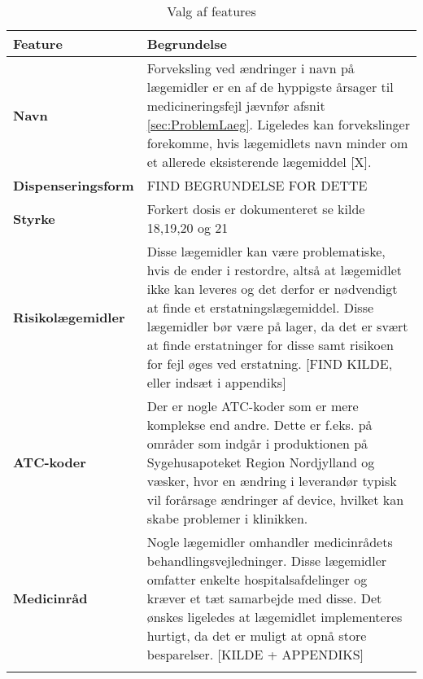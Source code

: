 \begin{table}[H]
\caption{Valg af features}
\label{table:features}
\vspace{0.5cm}
\begin{tabular}{p{3.5cm} | p{11cm}}
{\cellcolor[HTML]{C0C0C0}\textbf{Feature}} & {\cellcolor[HTML]{C0C0C0}\textbf{Begrundelse}} \vspace{2mm} \\ \hline \vspace{0.1mm}
\textbf{Navn} & \vspace{0.1mm} Forveksling ved ændringer i navn på lægemidler er en af de hyppigste årsager til medicineringsfejl jævnfør afsnit \ref{sec:ProblemLaeg}. Ligeledes kan forvekslinger forekomme, hvis lægemidlets navn minder om et allerede eksisterende lægemiddel [X]. \\  \hline \vspace{0.1mm}
\textbf{Dispenseringsform} & \vspace{0.1mm} FIND BEGRUNDELSE FOR DETTE  \\ \hline \vspace{0.1mm}
\textbf{Styrke} & \vspace{0.1mm} Forkert dosis er dokumenteret se kilde 18,19,20 og 21  \\ \hline \vspace{0.1mm}
\textbf{Risikolægemidler} & \vspace{0.1mm} Disse lægemidler kan være problematiske, hvis de ender i restordre, altså at lægemidlet ikke kan leveres og det derfor er nødvendigt at finde et erstatningslægemiddel. Disse lægemidler bør være på lager, da det er svært at finde erstatninger for disse samt risikoen for fejl øges ved erstatning. [FIND KILDE, eller indsæt i appendiks]  \\ \hline \vspace{0.1mm}
\textbf{ATC-koder} & \vspace{0.1mm} Der er nogle ATC-koder som er mere komplekse end andre. Dette er f.eks. på områder som indgår i produktionen på Sygehusapoteket Region Nordjylland og væsker, hvor en ændring i leverandør typisk vil forårsage ændringer af device, hvilket kan skabe problemer i klinikken.  \\ \hline \vspace{0.1mm}
\textbf{Medicinråd} & \vspace{0.1mm} Nogle lægemidler omhandler medicinrådets behandlingsvejledninger. Disse lægemidler omfatter enkelte hospitalsafdelinger og kræver et tæt samarbejde med disse. Det ønskes ligeledes at lægemidlet implementeres hurtigt, da det er muligt at opnå store besparelser. [KILDE + APPENDIKS]\\ \hline \vspace{0.1mm}

\end{tabular}
\end{table}
